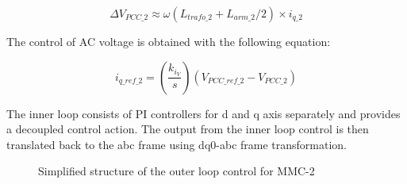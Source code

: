 \begin{equation}
   \Delta V_{PCC\_2} \approx \omega(L_{trafo\_2}+L_{arm\_2}/2)\times i_{q\_2}
\end{equation}

The control of \gls{AC} voltage is obtained with the following equation:

\begin{equation}
    i_{q\_ref\_2} =  \left(\frac{k_{i_V}}{s}\right)\left(V_{PCC\_{ref}\_2}-V_{PCC\_2}\right)
\end{equation}

The inner loop consists of \gls{PI} controllers for d and q axis separately and provides a decoupled control action. The output from the inner loop control is then translated back to the abc frame using dq0-abc frame transformation. 

\begin{figure}[H]
\centering


\vspace{10mm}


\caption{Simplified structure of the outer loop control for MMC-2 \cite{saad2015modelisation}}

\end{figure}

